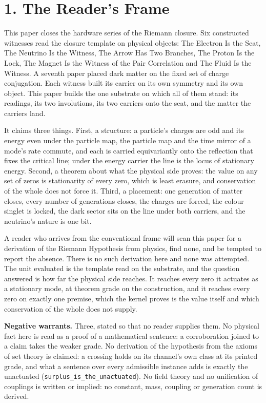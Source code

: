 \documentclass[10pt]{article}
\begin{document}
\hypertarget{the-readers-frame}{%
\section{1. The Reader's Frame}\label{the-readers-frame}}

This paper closes the hardware series of the Riemann closure. Six
constructed witnesses read the closure template on physical objects: The
Electron Is the Seat, The Neutrino Is the Witness, The Arrow Has Two
Branches, The Proton Is the Lock, The Magnet Is the Witness of the Pair
Correlation and The Fluid Is the Witness. A seventh paper placed dark
matter on the fixed set of charge conjugation. Each witness built its
carrier on its own symmetry and its own object. This paper builds the
one substrate on which all of them stand: its readings, its two
involutions, its two carriers onto the seat, and the matter the carriers
land.

It claims three things. First, a structure: a particle's charges are odd
and its energy even under the particle map, the particle map and the
time mirror of a mode's rate commute, and each is carried equivariantly
onto the reflection that fixes the critical line; under the energy
carrier the line is the locus of stationary energy. Second, a theorem
about what the physical side proves: the value on any set of zeros is
stationarity of every zero, which is least erasure, and conservation of
the whole does not force it. Third, a placement: one generation of
matter closes, every number of generations closes, the charges are
forced, the colour singlet is locked, the dark sector sits on the line
under both carriers, and the neutrino's nature is one bit.

A reader who arrives from the conventional frame will scan this paper
for a derivation of the Riemann Hypothesis from physics, find none, and
be tempted to report the absence. There is no such derivation here and
none was attempted. The unit evaluated is the template read on the
substrate, and the question answered is how far the physical side
reaches. It reaches every zero it actuates as a stationary mode, at
theorem grade on the construction, and it reaches every zero on exactly
one premise, which the kernel proves is the value itself and which
conservation of the whole does not supply.

\textbf{Negative warrants.} Three, stated so that no reader supplies
them. No physical fact here is read as a proof of a mathematical
sentence: a corroboration joined to a claim takes the weaker grade. No
derivation of the hypothesis from the axioms of set theory is claimed: a
crossing holds on its channel's own class at its printed grade, and what
a sentence over every admissible instance adds is exactly the unactuated
(\texttt{surplus\_is\_the\_unactuated}). No field theory and no
unification of couplings is written or implied: no constant, mass,
coupling or generation count is derived.
\end{document}

